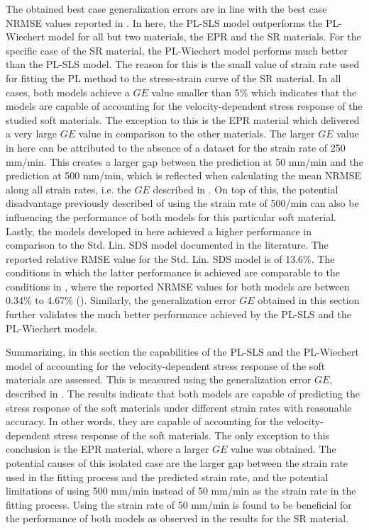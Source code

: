 The obtained best case generalization errors are in line with the best case NRMSE values reported in . In here, the PL-SLS model outperforms the PL-Wiechert model for all but two materials, the EPR and the SR materials. For the specific case of the SR material, the PL-Wiechert model performs much better than the PL-SLS model. The reason for this is the small value of strain rate used for fitting the PL method to the stress-strain curve of the SR material. In all cases, both models achieve a $GE$ value smaller than 5\% which indicates that the models are capable of accounting for the velocity-dependent stress response of the studied soft materials. The exception to this is the EPR material which delivered a very large $GE$ value in comparison to the other materials. The larger $GE$ value in here can be attributed to the absence of a dataset for the strain rate of 250 mm/min. This creates a larger gap between the prediction at 50 mm/min and the prediction at 500 mm/min, which is reflected when calculating the mean NRMSE along all strain rates, i.e. the $GE$ described in . On top of this, the potential disadvantage previously described of using the strain rate of 500/min can also be influencing the performance of both models for this particular soft material. Lastly, the models developed in here achieved a higher performance in comparison to the Std. Lin. SDS model documented in the literature. The reported relative RMSE value for the Std. Lin. SDS model is of 13.6\%. The conditions in which the latter performance is achieved are comparable to the conditions in , where the reported NRMSE values for both models are between 0.34\% to 4.67\% (). Similarly, the generalization error $GE$ obtained in this section further validates the much better performance achieved by the PL-SLS and the PL-Wiechert models.

Summarizing, in this section the capabilities of the PL-SLS and the PL-Wiechert model of accounting for the velocity-dependent stress response of the soft materials are assessed. This is measured using the generalization error $GE$, described in . The results indicate that both models are capable of predicting the stress response of the soft materials under different strain rates with reasonable accuracy. In other words, they are capable of accounting for the velocity-dependent stress response of the soft materials. The only exception to this conclusion is the EPR material, where a larger $GE$ value was obtained. The potential causes of this isolated case are the larger gap between the strain rate used in the fitting process and the predicted strain rate, and the potential limitations of using 500 mm/min instead of 50 mm/min as the strain rate in the fitting process. Using the strain rate of 50 mm/min is found to be beneficial for the performance of both models as observed in the results for the SR material.

